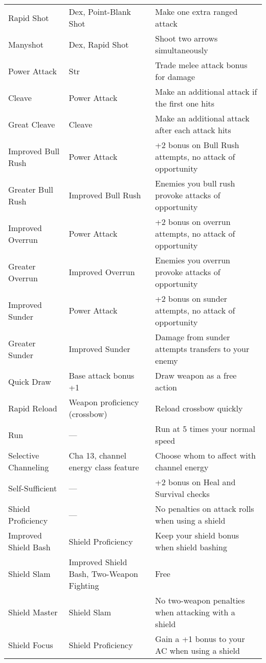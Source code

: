 \begin{table}[]
\begin{tabular}{lll}
\quad Rapid Shot & Dex, Point-Blank Shot & Make one extra ranged attack\\
\quad \quad Manyshot & Dex, Rapid Shot & Shoot two arrows simultaneously\\
Power Attack & Str & Trade melee attack bonus for damage\\
\quad Cleave & Power Attack & Make an additional attack if the first one hits\\
\quad \quad Great Cleave & Cleave & Make an additional attack after each attack hits\\
\quad Improved Bull Rush & Power Attack & +2 bonus on Bull Rush attempts, no attack of opportunity\\
\quad \quad Greater Bull Rush & Improved Bull Rush & Enemies you bull rush provoke attacks of opportunity\\
\quad Improved Overrun & Power Attack & +2 bonus on overrun attempts, no attack of opportunity\\
\quad \quad Greater Overrun & Improved Overrun & Enemies you overrun provoke attacks of opportunity \\
\quad Improved Sunder & Power Attack & +2 bonus on sunder attempts, no attack of opportunity\\
\quad \quad Greater Sunder & Improved Sunder & Damage from sunder attempts transfers to your enemy\\
Quick Draw & Base attack bonus +1 & Draw weapon as a free action\\
Rapid Reload & Weapon proficiency (crossbow) & Reload crossbow quickly\\
Run & — & Run at 5 times your normal speed\\
Selective Channeling & Cha 13, channel energy class feature & Choose whom to affect with channel energy\\
Self-Sufficient & — & +2 bonus on Heal and Survival checks\\
Shield Proficiency & — & No penalties on attack rolls when using a shield\\
\quad Improved Shield Bash & Shield Proficiency & Keep your shield bonus when shield bashing\\
\quad \quad Shield Slam & Improved Shield Bash, Two-Weapon Fighting & Free \\
\quad \quad \quad Shield Master & Shield Slam & No two-weapon penalties when attacking with a shield\\
\quad Shield Focus & Shield Proficiency & Gain a +1 bonus to your AC when using a shield\\

\end{tabular}
\end{table}

